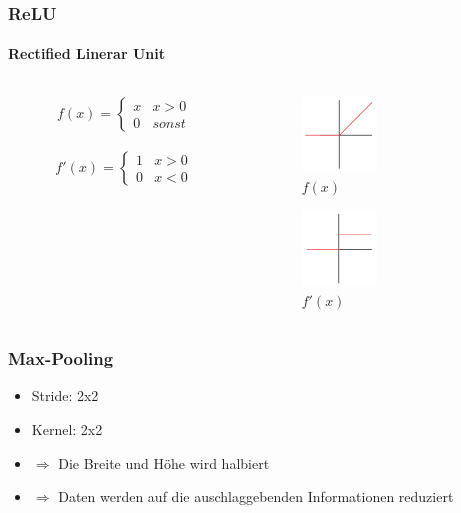 \documentclass[10pt]{beamer}
\begin{document}
\begin{frame}
\frametitle{ReLU}
\framesubtitle{\textbf{Re}ctified \textbf{L}inerar \textbf{U}nit}
\begin{columns}
	\begin{column}{.5\textwidth}
		\begin{equation*}
				f(x) =
					\begin{cases*}
					x & x>0 \\
					0 & sonst
					\end{cases*}
		\end{equation*}\ \ \ \\
		\begin{equation*}
				f'(x) =
					\begin{cases*}
					1 & x>0 \\
					0 & x<0
					\end{cases*}
		\end{equation*}
	\end{column}

	\begin{column}{.5\textwidth}
		\begin{figure}
			\includegraphics[width=20mm]{relu.png}
			\caption{$f(x)$}
		\end{figure}
		\begin{figure}
			\includegraphics[width=20mm]{relu_prime.png}
			\caption{$f'(x)$}
		\end{figure}
	\end{column}
\end{columns}
\end{frame}

\begin{frame}
\frametitle{Max-Pooling}
\begin{itemize}
	\setlength\itemsep{1em}
	\item Stride: 2x2
	\item Kernel: 2x2
	\item[] $\Rightarrow$ Die Breite und H\"ohe wird halbiert
	\item[] $\Rightarrow$ Daten werden auf die auschlaggebenden Informationen reduziert
\end{itemize}
\end{frame}
\end{document}
